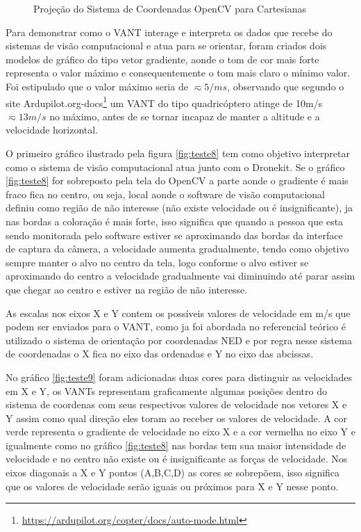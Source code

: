 \begin{figure}[htpb]
	\centering
	\caption{Projeção do Sistema de Coordenadas OpenCV para Cartesianas}
	
	\label{fig:conv}
\end{figure}

Para demonstrar como o VANT interage e interpreta os dados que recebe do sistemas de visão computacional e atua para se orientar, foram criados dois modelos de gráfico do tipo vetor gradiente, aonde o tom de cor mais forte representa o valor máximo e consequentemente o tom mais claro o mínimo valor. Foi estipulado que o valor máximo seria de $\displaystyle \eqsim 5/ms$, observando que segundo o site Ardupilot.org-docs\footnote{\url{https://ardupilot.org/copter/docs/auto-mode.html}} um VANT do tipo quadricóptero atinge de 10m/s $\displaystyle \eqsim13m/s$ no máximo, antes de se tornar incapaz de manter a altitude e a velocidade horizontal. 

O primeiro gráfico ilustrado pela figura \ref{fig:teste8} tem como objetivo interpretar como o sistema de visão computacional atua junto com o Dronekit. Se o gráfico \ref{fig:teste8} for sobreposto pela tela do OpenCV a parte aonde o gradiente é mais fraco fica no centro, ou seja, local aonde o software de visão computacional definiu como região de não interesse (não existe velocidade ou é insignificante), ja nas bordas a coloração é mais forte, isso significa que quando a pessoa que esta sendo monitorada pelo software estiver se aproximando  das bordas da interface de captura da câmera, a velocidade aumenta gradualmente, tendo como objetivo sempre manter o alvo no centro da tela, logo conforme o alvo estiver se aproximando do centro a velocidade gradualmente vai diminuindo até parar assim que chegar ao centro e estiver na região de não interesse.

As escalas nos eixos X e Y contem os possíveis valores de velocidade em m/s que podem ser enviados para o VANT, como ja foi abordada no referencial teórico é utilizado o sistema de orientação por coordenadas NED e por regra nesse sistema de coordenadas o X fica no eixo das ordenadas e Y no eixo das abcissas.

No gráfico \ref{fig:teste9} foram adicionadas duas cores para distinguir as velocidades em X e Y, os VANTs representam graficamente algumas posições dentro do sistema de coordenas com seus respectivos valores de velocidade nos vetores X e Y assim como qual direção eles toram ao receber os valores de velocidade. A cor verde representa o gradiente de velocidade no eixo X e a cor vermelha no eixo Y e igualmente como no gráfico \ref{fig:teste8} nas bordas tem sua maior intensidade de velocidade e no centro não existe ou é insignificante as forças de velocidade. Nos eixos diagonais a X e Y pontos (A,B,C,D) as cores se sobrepõem, isso significa que os valores de velocidade serão iguais ou próximos para X e Y nesse ponto.

